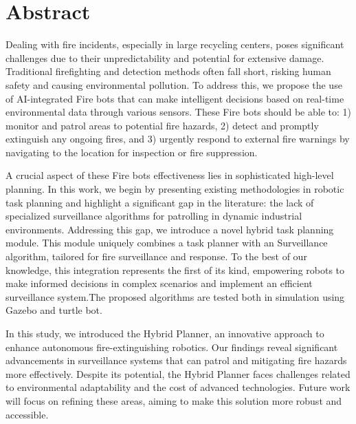\chapter*{Abstract}

Dealing with fire incidents, especially in large recycling centers, poses significant challenges due to their unpredictability and potential for extensive damage. Traditional firefighting and detection methods often fall short, risking human safety and causing environmental pollution. To address this, we propose the use of AI-integrated Fire bots that can make intelligent decisions based on real-time environmental data through various sensors. These Fire bots should be able to: 1) monitor and patrol areas to  potential fire hazards, 2) detect and promptly extinguish any ongoing fires, and 3) urgently respond to external fire warnings by navigating to the location for inspection or fire suppression.

A crucial aspect of these Fire bots effectiveness lies in sophisticated high-level planning. In this work, we begin by presenting existing methodologies in robotic task planning and highlight a significant gap in the literature: the lack of specialized surveillance algorithms for patrolling in dynamic industrial environments. Addressing this gap, we introduce a novel hybrid task planning module. This module uniquely combines a task planner with an Surveillance algorithm, tailored for fire surveillance and response. To the best of our knowledge, this integration represents the first of its kind, empowering robots to make informed decisions in complex scenarios and implement an efficient surveillance system.The proposed algorithms are tested both in simulation using Gazebo and turtle bot.

In this study, we introduced the Hybrid Planner, an innovative approach to enhance autonomous fire-extinguishing robotics. Our findings reveal significant advancements in surveillance systems that can patrol  and mitigating fire hazards more effectively. Despite its potential, the Hybrid Planner faces challenges related to environmental adaptability and the cost of advanced technologies. Future work will focus on refining these areas, aiming to make this solution more robust and accessible. 